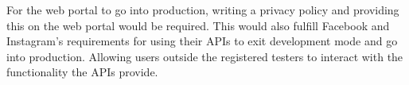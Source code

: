 For the web portal to go into production, writing a privacy policy and providing this on the web portal would be required. This would also fulfill Facebook and Instagram's requirements for using their APIs to exit development mode and go into production. Allowing users outside the registered testers to interact with the functionality the APIs provide.

\cleardoublepage